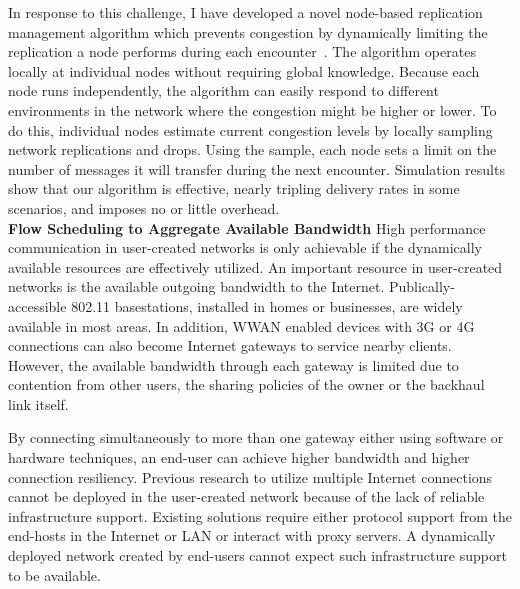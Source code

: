 \documentclass[10pt]{article}
\begin{document}
In response to this challenge, I have developed a novel
node-based replication management algorithm which prevents congestion by
dynamically limiting the
replication a node performs during each encounter~\cite{thompson:cc:infocom10}. 
The algorithm operates locally at individual nodes without requiring global
knowledge.  Because each node runs independently, the algorithm can easily
respond to different environments in the network where the congestion might be
higher or lower.
To do this, individual nodes estimate
current congestion levels by locally sampling network replications and drops.
Using the sample, each node sets a limit on the number of messages it will
transfer during the next encounter.
Simulation results show that our algorithm is
effective, nearly tripling delivery rates in some scenarios, and
imposes no or little overhead. \\



\noindent \textbf{Flow Scheduling to Aggregate Available Bandwidth}
High performance communication in user-created networks is only achievable if
the dynamically available resources are effectively utilized.  An important
resource in user-created networks
is the available outgoing bandwidth to the Internet.  Publically-accessible
802.11 basestations, installed in homes or businesses, are widely available in
most areas.  In addition, WWAN enabled devices with 3G or 4G connections
can also become Internet gateways to service nearby clients.
However, the available bandwidth through each gateway is limited due to
contention from other users, the sharing policies of the owner or the backhaul
link itself.

By connecting simultaneously to more than one gateway either using software or
hardware techniques, an end-user can achieve higher bandwidth and higher
connection resiliency.
Previous research to utilize multiple Internet connections cannot be deployed in
the user-created network because of the lack of reliable infrastructure support.
Existing solutions require either protocol support from the end-hosts in the
Internet or LAN or interact with proxy servers.
A dynamically deployed network created by end-users cannot expect such
infrastructure support to be available.
\end{document}

